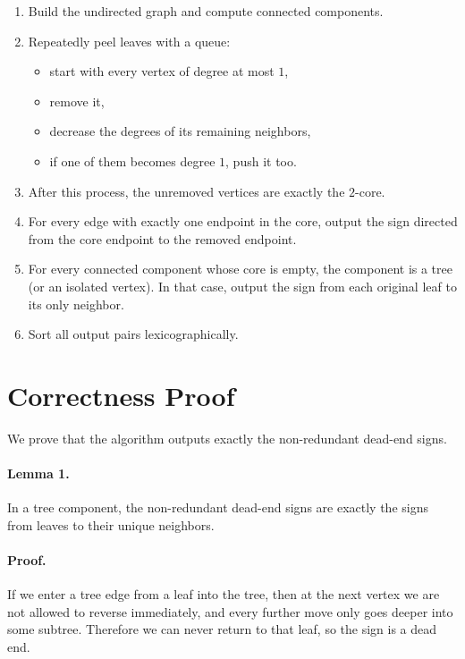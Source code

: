 \documentclass[11pt]{article}
\begin{document}
\begin{enumerate}[leftmargin=*]
    \item Build the undirected graph and compute connected components.
    \item Repeatedly peel leaves with a queue:
    \begin{itemize}[leftmargin=*]
        \item start with every vertex of degree at most $1$,
        \item remove it,
        \item decrease the degrees of its remaining neighbors,
        \item if one of them becomes degree $1$, push it too.
    \end{itemize}
    \item After this process, the unremoved vertices are exactly the $2$-core.
    \item For every edge with exactly one endpoint in the core, output the sign directed from the core endpoint to the removed endpoint.
    \item For every connected component whose core is empty, the component is a tree (or an isolated vertex). In that case, output the sign from each original leaf to its only neighbor.
    \item Sort all output pairs lexicographically.
\end{enumerate}

\section*{Correctness Proof}

We prove that the algorithm outputs exactly the non-redundant dead-end signs.

\paragraph{Lemma 1.}
In a tree component, the non-redundant dead-end signs are exactly the signs from leaves to their unique neighbors.

\paragraph{Proof.}
If we enter a tree edge from a leaf into the tree, then at the next vertex we are not allowed to reverse immediately, and every further move only goes deeper into some subtree. Therefore we can never return to that leaf, so the sign is a dead end.
\end{document}

